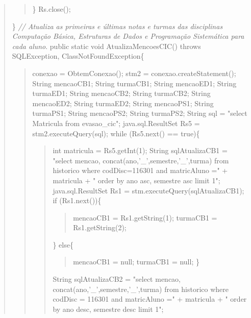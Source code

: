 \begin{quote}
\begin{quote}
		\} \newline
		Rs.close();
	\end{quote}
	\}\newline
	\newline
	\textit{//	Atualiza as primeiras e últimas notas e turmas das disciplinas Computação Básica, Estruturas de Dados e Programação Sistemática para cada aluno}. \newline
	public static void AtualizaMencoesCIC() throws SQLException, ClassNotFoundException\{
	\begin{quote}
		conexao = ObtemConexao(); \newline
		stm2 = conexao.createStatement(); \newline
		String mencaoCB1; \newline
		String turmaCB1; \newline
		String mencaoED1; \newline
		String turmaED1; \newline
		String mencaoCB2; \newline
		String turmaCB2; \newline
		String mencaoED2; \newline
		String turmaED2; \newline
		String mencaoPS1; \newline
		String turmaPS1; \newline
		String mencaoPS2; \newline
		String turmaPS2; \newline
		String sql = "select Matricula from evasao\_cic"; \newline
		java.sql.ResultSet Rs5 = stm2.executeQuery(sql); \newline
		while (Rs5.next() == true)\{
		\begin{quote}
			int matricula = Rs5.getInt(1); \newline
			String sqlAtualizaCB1 = "select mencao, concat(ano,'\_',semestre,'\_',turma) from historico where codDisc=116301 and matricAluno =" + matricula + 
			" order by ano asc, semestre asc limit 1"; \newline
			java.sql.ResultSet Rs1 = stm.executeQuery(sqlAtualizaCB1); \newline
			if (Rs1.next())\{
			\begin{quote}
				mencaoCB1 = Rs1.getString(1); \newline
				turmaCB1 = Rs1.getString(2); 
			\end{quote}
			\} \newline
			else\{
			\begin{quote}
				mencaoCB1 = null; \newline
				turmaCB1 = null; \newline
				\} 
			\end{quote}
			String sqlAtualizaCB2 = "select mencao, concat(ano,'\_',semestre,'\_',turma) from historico where codDisc = 116301 and matricAluno ="
			 + matricula + " order by ano desc, semestre desc limit 1"; \newline
			

\end{quote}
\end{quote}
\end{quote}

